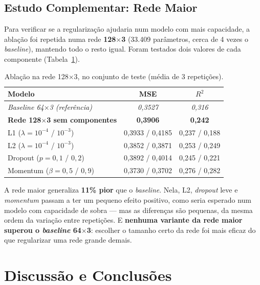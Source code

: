 \documentclass[11pt,a4paper]{article}
\begin{document}
\subsection{Estudo Complementar: Rede Maior}

Para verificar se a regularização ajudaria num modelo com mais capacidade, a ablação foi repetida numa rede \textbf{128$\times$3} (33.409 parâmetros, cerca de 4 vezes o \textit{baseline}), mantendo todo o resto igual. Foram testados dois valores de cada componente (Tabela~\ref{tab:complementar}).

\begin{table}[h]
\centering
\small
\caption{Ablação na rede 128$\times$3, no conjunto de teste (média de 3 repetições).}
\label{tab:complementar}
\begin{tabular}{lcc}
\toprule
\textbf{Modelo} & \textbf{MSE} & \textbf{$R^2$} \\
\midrule
\textit{Baseline 64$\times$3 (referência)} & \textit{0,3527} & \textit{0,316} \\
\midrule
\textbf{Rede 128$\times$3 sem componentes} & \textbf{0,3906} & \textbf{0,242} \\
L1 ($\lambda = 10^{-4}$ / $10^{-3}$) & 0,3933 / 0,4185 & 0,237 / 0,188 \\
L2 ($\lambda = 10^{-4}$ / $10^{-3}$) & 0,3852 / 0,3871 & 0,253 / 0,249 \\
Dropout ($p = 0{,}1$ / $0{,}2$) & 0,3892 / 0,4014 & 0,245 / 0,221 \\
Momentum ($\beta = 0{,}5$ / $0{,}9$) & 0,3730 / 0,3702 & 0,276 / 0,282 \\
\bottomrule
\end{tabular}
\end{table}

A rede maior generaliza \textbf{11\% pior} que o \textit{baseline}. Nela, L2, \textit{dropout} leve e \textit{momentum} passam a ter um pequeno efeito positivo, como seria esperado num modelo com capacidade de sobra --- mas as diferenças são pequenas, da mesma ordem da variação entre repetições. E \textbf{nenhuma variante da rede maior superou o \textit{baseline} 64$\times$3}: escolher o tamanho certo da rede foi mais eficaz do que regularizar uma rede grande demais.

\section{Discussão e Conclusões}
\end{document}
